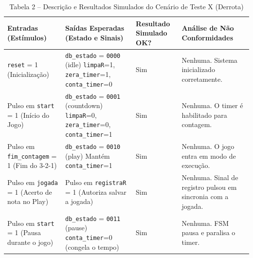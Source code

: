\documentclass[a4paper,12pt,twoside]{article}
\begin{document}
  \begin{table}[H]
  \centering
  \caption{Tabela 2 -- Descrição e Resultados Simulados do Cenário de Teste X (Derrota)}
  \begin{tabular}{|>{\centering\arraybackslash}p{}|>{\centering\arraybackslash}p{}
  |>{\centering\arraybackslash}p{}|>{\centering\arraybackslash}p{}|}
  \hline
  \textbf{Entradas (Estímulos)} & \textbf{Saídas Esperadas (Estado e Sinais)} & \textbf{Resultado Simulado
  OK?} & \textbf{Análise de Não Conformidades} \\ \hline


  \texttt{reset} = 1 \newline (Inicialização) &
  \texttt{db\_estado} = \texttt{0000} (idle) \newline \texttt{limpaR}=1, \texttt{zera\_timer}=1,
  \texttt{conta\_timer}=0 &
  Sim &
  Nenhuma. Sistema inicializado corretamente. \\ \hline


  Pulso em \texttt{start} = 1 \newline (Início do Jogo) &
  \texttt{db\_estado} = \texttt{0001} (countdown) \newline \texttt{limpaR}=0, \texttt{zera\_timer}=0,
  \texttt{conta\_timer}=1 &
  Sim &
  Nenhuma. O timer é habilitado para contagem. \\ \hline


  Pulso em \texttt{fim\_contagem} = 1 \newline (Fim do 3-2-1) &
  \texttt{db\_estado} = \texttt{0010} (play) \newline Mantém \texttt{conta\_timer}=1 &
  Sim &
  Nenhuma. O jogo entra em modo de execução. \\ \hline


  Pulso em \texttt{jogada} = 1 \newline (Acerto de nota no Play) &
  Pulso em \texttt{registraR} = 1 \newline (Autoriza salvar a jogada) &
  Sim &
  Nenhuma. Sinal de registro pulsou em sincronia com a jogada. \\ \hline


  Pulso em \texttt{start} = 1 \newline (Pausa durante o jogo) &
  \texttt{db\_estado} = \texttt{0011} (pause) \newline \texttt{conta\_timer}=0 (congela o tempo) &
  Sim &
  Nenhuma. FSM pausa e paralisa o timer. \\ \hline



\end{tabular}
\end{table}
\end{document}
